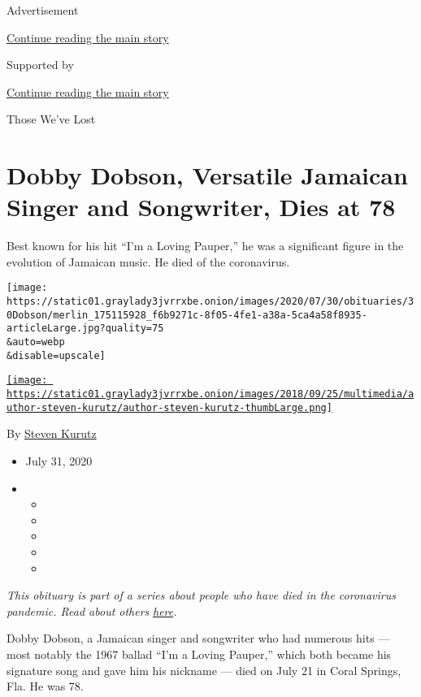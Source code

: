 Advertisement

\protect\hyperlink{after-top}{Continue reading the main story}

Supported by

\protect\hyperlink{after-sponsor}{Continue reading the main story}

Those We've Lost

\hypertarget{dobby-dobson-versatile-jamaican-singer-and-songwriter-dies-at-78}{%
\section{Dobby Dobson, Versatile Jamaican Singer and Songwriter, Dies at
78}\label{dobby-dobson-versatile-jamaican-singer-and-songwriter-dies-at-78}}

Best known for his hit ``I'm a Loving Pauper,'' he was a significant
figure in the evolution of Jamaican music. He died of the coronavirus.

\texttt{[image: https://static01.graylady3jvrrxbe.onion/images/2020/07/30/obituaries/30Dobson/merlin\_175115928\_f6b9271c-8f05-4fe1-a38a-5ca4a58f8935-articleLarge.jpg?quality=75\\\&auto=webp\\\&disable=upscale]}

\href{https://www.nytimes3xbfgragh.onion/by/steven-kurutz}{\texttt{[image: https://static01.graylady3jvrrxbe.onion/images/2018/09/25/multimedia/author-steven-kurutz/author-steven-kurutz-thumbLarge.png]}}

By \href{https://www.nytimes3xbfgragh.onion/by/steven-kurutz}{Steven
Kurutz}

\begin{itemize}
\item
  July 31, 2020
\item
  \begin{itemize}
  \item
  \item
  \item
  \item
  \item
  \end{itemize}
\end{itemize}

\emph{This obituary is part of a series about people who have died in
the coronavirus pandemic. Read about others}
\href{https://www.nytimes3xbfgragh.onion/interactive/2020/obituaries/people-died-coronavirus-obituaries.html}{\emph{here}}\emph{.}

Dobby Dobson, a Jamaican singer and songwriter who had numerous hits ---
most notably the 1967 ballad ``I'm a Loving Pauper,'' which both became
his signature song and gave him his nickname --- died on July 21 in
Coral Springs, Fla. He was 78.

